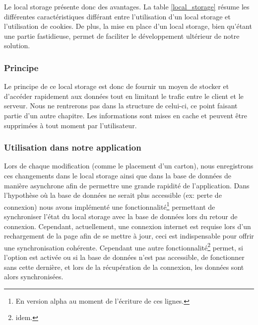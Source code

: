 



Le local storage présente donc des avantages. La table \ref{local_storage} résume les différentes caractéristiques différant entre l'utilisation d'un local storage et l'utilisation de cookies.
\newline
\indent
De plus, la mise en place d'un local storage, bien qu'étant une partie fastidieuse, permet de faciliter le développement ultérieur de notre solution.

  
\subsubsection{Principe}

Le principe de ce local storage est donc de fournir un moyen de stocker et d'accéder rapidement aux données tout en limitant le trafic entre le client et le serveur. Nous ne rentrerons pas dans la structure de celui-ci, ce point faisant partie d'un autre chapitre. Les informations sont mises en cache et peuvent être supprimées à tout moment par l'utilisateur.

\subsubsection{Utilisation dans notre application}
Lors de chaque modification (comme le placement d'un carton), nous enregistrons ces changements dans le local storage ainsi que dans la base de données de manière asynchrone afin de permettre une grande rapidité de l'application. 
\newline
\indent
Dans l'hypothèse où la base de données ne serait plus accessible (ex: perte de connexion) nous avons implémenté une fonctionnalité\footnote{En version alpha au moment de l'écriture de ces lignes.} permettant de synchroniser l'état du local storage avec la base de données lors du retour de connexion.
\newline
\indent
Cependant, actuellement, une connexion internet est requise lors d'un rechargement de la page afin de se mettre à jour, ceci est indispensable pour offrir une synchronisation cohérente. Cependant une autre fonctionnalité\footnote{idem.} permet, si l'option est activée ou si la base de données n'est pas accessible, de fonctionner sans cette dernière, et lors de la récupération de la connexion, les données sont alors synchronisées.



